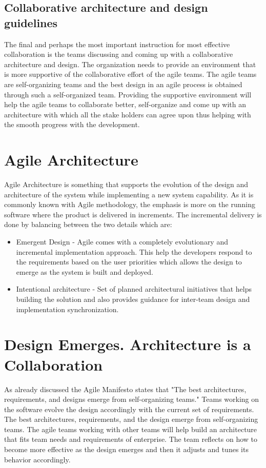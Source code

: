 \documentclass[sigconf]{acmart}
\begin{document}
\subsection {Collaborative architecture and design guidelines}
The final and perhaps the most important instruction for most effective collaboration is the teams discussing and coming up with a collaborative architecture and design. The organization needs to provide an environment that is more supportive of the collaborative effort of the agile teams. The agile teams are self-organizing teams and the best design in an agile process is obtained through such a self-organized team. Providing the supportive environment will help the agile teams to collaborate better, self-organize and come up with an architecture with which all the stake holders can agree upon thus helping with the smooth progress with the development.

\section{Agile Architecture}
Agile Architecture is something that supports the evolution of the design and architecture of the system while implementing a new system capability\cite{Saf01}. As it is commonly known with Agile methodology, the emphasis is more on the running software where the product is delivered in increments. The incremental delivery is done by balancing between the two details which are:

\begin{itemize}
  \item Emergent Design - Agile comes with a completely evolutionary and incremental implementation approach. This help the developers respond to the requirements based on the user priorities which allows the design to emerge as the system is built and deployed. 

  \item Intentional architecture - Set of planned architectural initiatives that helps building the solution and also provides guidance for inter-team design and implementation synchronization.
\end{itemize}

\section{Design Emerges. Architecture is a Collaboration}
As already discussed the Agile Manifesto states that "The best architectures, requirements, and designs emerge from self-organizing teams." Teams working on the software evolve the design accordingly with the current set of requirements. The best architectures, requirements, and the design emerge from self-organizing teams. The agile teams working with other teams will help build an architecture that fits team needs and requirements of enterprise. The team reflects on how to become more effective as the design emerges and then it adjusts and tunes its behavior accordingly.
\end{document}
